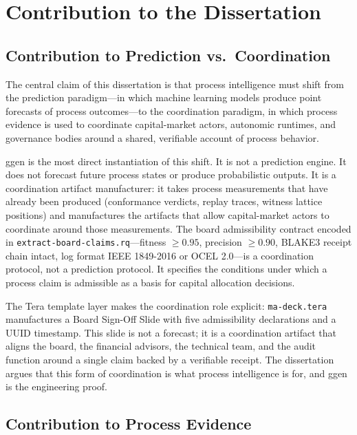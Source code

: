 
\section{Contribution to the Dissertation}
\label{sec:ggen-contribution}

\subsection{Contribution to Prediction vs.~Coordination}
\label{sec:ggen-contribution-prediction-coordination}

The central claim of this dissertation is that process intelligence must shift from the
prediction paradigm---in which machine learning models produce point forecasts of process
outcomes---to the coordination paradigm, in which process evidence is used to coordinate
capital-market actors, autonomic runtimes, and governance bodies around a shared, verifiable
account of process behavior.

ggen is the most direct instantiation of this shift. It is not a prediction engine. It does not
forecast future process states or produce probabilistic outputs. It is a coordination artifact
manufacturer: it takes process measurements that have already been produced (conformance verdicts,
replay traces, witness lattice positions) and manufactures the artifacts that allow capital-market
actors to coordinate around those measurements. The board admissibility contract encoded in
\texttt{extract-board-claims.rq}---fitness $\geq 0.95$, precision $\geq 0.90$, BLAKE3 receipt
chain intact, log format IEEE 1849-2016 or OCEL 2.0---is a coordination protocol, not a
prediction protocol. It specifies the conditions under which a process claim is admissible as a
basis for capital allocation decisions.

The Tera template layer makes the coordination role explicit: \texttt{ma-deck.tera} manufactures
a Board Sign-Off Slide with five admissibility declarations and a UUID timestamp. This slide is
not a forecast; it is a coordination artifact that aligns the board, the financial advisors, the
technical team, and the audit function around a single claim backed by a verifiable receipt. The
dissertation argues that this form of coordination is what process intelligence is for, and ggen
is the engineering proof.

\subsection{Contribution to Process Evidence}
\label{sec:ggen-contribution-process-evidence}

